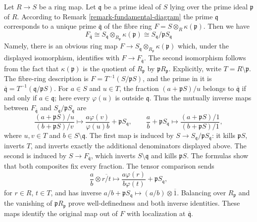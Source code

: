 \begin{remark}
\label{remark-local-ring-fibre}
Let $R \to S$ be a ring map. Let $\mathfrak q$ be a prime
ideal of $S$ lying over the prime ideal $\mathfrak p$ of $R$.
According to Remark \ref{remark-fundamental-diagram}
the prime $\mathfrak q$ corresponds to a unique prime
$\overline{\mathfrak q}$ of the fibre ring
$F = S \otimes_R \kappa(\mathfrak p)$.
Then we have
$$
F_{\overline{\mathfrak q}}
\cong S_\mathfrak q \otimes_{R_\mathfrak p} \kappa(\mathfrak p)
\cong S_\mathfrak q/\mathfrak p S_\mathfrak q
$$
Namely, there is an obvious ring map
$F \to S_\mathfrak q \otimes_{R_\mathfrak p} \kappa(\mathfrak p)$
which, under the displayed isomorphism, identifies with $F \to F_{\overline{\mathfrak q}}$.
The second isomorphism follows from the fact that $\kappa(\mathfrak p)$
is the quotient of $R_\mathfrak p$ by $\mathfrak pR_\mathfrak p$.
Explicitly, write $T=R\setminus\mathfrak p$. The fibre-ring
description is $F=T^{-1}(S/\mathfrak pS)$, and the prime in it is
$\overline{\mathfrak q}=T^{-1}(\mathfrak q/\mathfrak pS)$.
For $a\in S$ and $u\in T$, the fraction
$(a+\mathfrak pS)/u$ belongs to $\overline{\mathfrak q}$
if and only if $a\in\mathfrak q$; here every $\varphi(u)$
is outside $\mathfrak q$.
Thus the mutually inverse maps between $F_{\overline{\mathfrak q}}$
and $S_{\mathfrak q}/\mathfrak pS_{\mathfrak q}$ are
$$
\frac{(a+\mathfrak pS)/u}{(b+\mathfrak pS)/v}
\longmapsto
\frac{a\varphi(v)}{\varphi(u)b}+\mathfrak pS_{\mathfrak q},
\qquad
\frac{a}{b}+\mathfrak pS_{\mathfrak q}
\longmapsto
\frac{(a+\mathfrak pS)/1}{(b+\mathfrak pS)/1},
$$
where $u,v\in T$ and $b\in S\setminus\mathfrak q$.
The first map is induced by $S\to S_{\mathfrak q}/\mathfrak pS_{\mathfrak q}$:
it kills $\mathfrak pS$, inverts $T$, and inverts exactly the
additional denominators displayed above. The second is induced by
$S\to F_{\overline{\mathfrak q}}$, which inverts
$S\setminus\mathfrak q$ and kills $\mathfrak pS$.
The formulas show that both composites fix every fraction.
The tensor comparison sends
$$
\frac{a}{b}\otimes\overline{r/t}
\longmapsto
\frac{a\varphi(r)}{b\varphi(t)}+\mathfrak pS_{\mathfrak q},
$$
for $r\in R$, $t\in T$, and has inverse
$a/b+\mathfrak pS_{\mathfrak q}\mapsto(a/b)\otimes\overline{1}$.
Balancing over $R_{\mathfrak p}$ and the vanishing of
$\mathfrak pR_{\mathfrak p}$ prove well-definedness and both
inverse identities. These maps identify the original map out of
$F$ with localization at $\overline{\mathfrak q}$.
\end{remark}